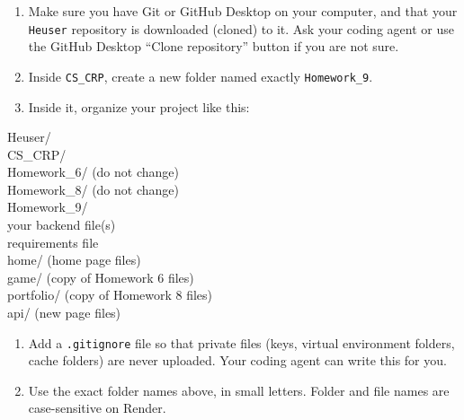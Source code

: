 \documentclass[11pt,a4paper]{article}
\begin{document}
\begin{enumerate}
\item Make sure you have Git or GitHub Desktop on your computer, and that your \texttt{Heuser} repository is downloaded (cloned) to it. Ask your coding agent or use the GitHub Desktop ``Clone repository'' button if you are not sure.
\item Inside \texttt{CS\_CRP}, create a new folder named exactly \texttt{Homework\_9}.
\item Inside it, organize your project like this:
\end{enumerate}

\begin{center}
\begin{minipage}{0.7\textwidth}
\ttfamily
Heuser/\\
\hspace*{1.2em}CS\_CRP/\\
\hspace*{2.4em}Homework\_6/ \hfill\rmfamily(do not change)\ttfamily\\
\hspace*{2.4em}Homework\_8/ \hfill\rmfamily(do not change)\ttfamily\\
\hspace*{2.4em}Homework\_9/\\
\hspace*{3.6em}your backend file(s)\\
\hspace*{3.6em}requirements file\\
\hspace*{3.6em}home/ \hfill\rmfamily(home page files)\ttfamily\\
\hspace*{3.6em}game/ \hfill\rmfamily(copy of Homework 6 files)\ttfamily\\
\hspace*{3.6em}portfolio/ \hfill\rmfamily(copy of Homework 8 files)\ttfamily\\
\hspace*{3.6em}api/ \hfill\rmfamily(new page files)\ttfamily
\end{minipage}
\end{center}

\begin{enumerate}[resume]
\item Add a \texttt{.gitignore} file so that private files (keys, virtual environment folders, cache folders) are never uploaded. Your coding agent can write this for you.
\item Use the exact folder names above, in small letters. Folder and file names are case-sensitive on Render.
\end{enumerate}
\end{document}
